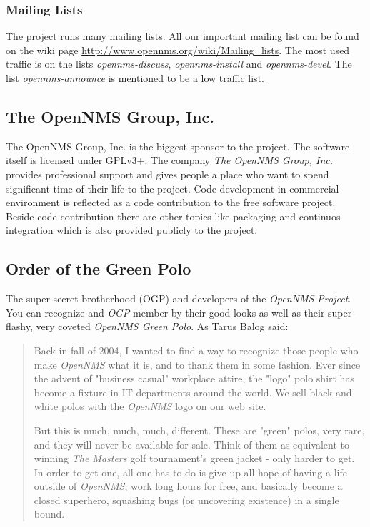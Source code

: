 \subsubsection{Mailing Lists}
The project runs many mailing lists. All our important mailing list can be found on the wiki page \url{http://www.opennms.org/wiki/Mailing_lists}. The most used traffic is on the lists \emph{opennms-discuss}, \emph{opennms-install} and \emph{opennms-devel}. The list \emph{opennms-announce} is mentioned to be a low traffic list.

\subsection*{The OpenNMS Group, Inc.}
The OpenNMS Group, Inc. is the biggest sponsor to the project. The software itself is licensed under GPLv3+. The company \emph{The OpenNMS Group, Inc.} provides professional support and gives people a place who want to spend significant time of their life to the project. Code development in commercial environment is reflected as a code contribution to the free software project. Beside code contribution there are other topics like packaging and continuos integration which is also provided publicly to the project.

\subsection*{Order of the Green Polo}
The super secret brotherhood (OGP) and developers of the \emph{OpenNMS Project}. You can recognize and \emph{OGP} member by their good looks as well as their super-flashy, very coveted \emph{OpenNMS Green Polo}. As Tarus Balog said:
 
\begin{quote}
Back in fall of 2004, I wanted to find a way to recognize those people who make \emph{OpenNMS} what it is, and to thank them in some fashion. 
Ever since the advent of "business casual" workplace attire, the "logo" polo shirt has become a fixture in IT departments around the world. We sell black and white polos with the \emph{OpenNMS} logo on our web site.

But this is much, much, much, different. These are "green" polos, very rare, and they will never be available for sale. Think of them as equivalent to winning \emph{The Masters} golf tournament's green jacket - only harder to get.
In order to get one, all one has to do is give up all hope of having a life outside of \emph{OpenNMS}, work long hours for free, and basically become a closed superhero, squashing bugs (or uncovering existence) in a single bound.
\end{quote}

